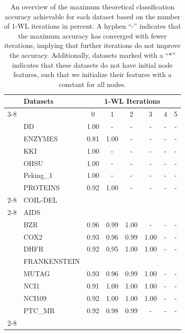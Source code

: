 \begin{table}[H]
	\caption{An overview of the maximum theoretical classification accuracy achievable for each dataset based on the number of 1-WL iterations in percent. A hyphen ``-'' indicates that the maximum accuracy has converged with fewer iterations, implying that further iterations do not improve the accuracy. Additionally, datasets marked with a ``$*$'' indicates that these datasets do not have initial node features, such that we initialize their features with a constant for all nodes.}
	\label{tab:max_accuracies_app}
		\begin{tabular}{@{}c <{\enspace}@{}lcccccc@{}}	\toprule
			& \multirow{3}{*}{\vspace*{4pt}\textbf{Datasets}}&\multicolumn{6}{c}{\textbf{1-WL Iterations}}\\\cmidrule{3-8}
			& & {0}  & {1}  & {2}  & {3} & {4}  & {5}
			\\
			\toprule

			\multirow{4}{*}{\rotatebox{90}{Bioinformatics}}
            & DD &1.00 & - & - & - & - & - \\
            & ENZYMES &0.81 & 1.00 & - & - & - & - \\
            & KKI & 1.00 & - & - & - & - & - \\
            & OHSU & 1.00 & - & - & - & - & - \\
            & Peking_1 & 1.00 & - & - & - & - & - \\
            & PROTEINS &0.92 & 1.00 & - & - & - & -\\

            \cmidrule{2-8}
            \multirow{1}{*}{\rotatebox{90}{C}}
            & COIL-DEL \\

            \cmidrule{2-8}
            \multirow{9}{*}{\rotatebox{90}{Small molecules}}
            & AIDS \\
            & BZR & 0.96 & 0.99 & 1.00 & - & - & - \\
            & COX2 & 0.93 & 0.96 & 0.99 & 1.00 & - & - \\
            & DHFR & 0.92 & 0.95 & 1.00 & 1.00 & - & - \\
            & FRANKENSTEIN \\
            & MUTAG &0.93 & 0.96 & 0.99 & 1.00 & - & - \\
            & NCI1 &0.91 & 1.00 & 1.00 & 1.00 & - & - \\
            & NCI109 & 0.92 & 1.00 & 1.00 & 1.00 & - & - \\
            & PTC\_MR &0.92 & 0.98 & 0.99 & - & - & - \\
            \cmidrule{2-8}


\end{tabular}
\end{table}
